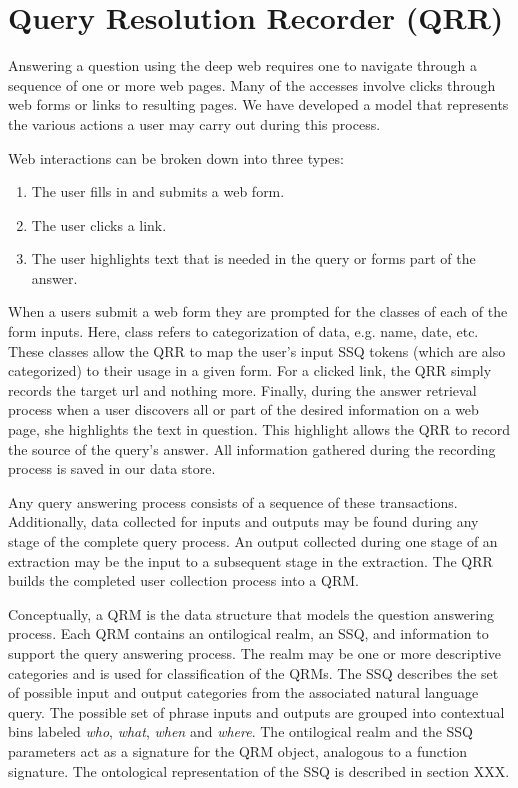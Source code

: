 \section{Query Resolution Recorder (QRR)}
\label{sec:qrr}
Answering a question using the deep web requires one to navigate
through a sequence of one or more web pages. Many of the accesses involve clicks through web forms or links to resulting pages.  We have developed a model that represents the various actions a user may carry out during this process.

Web interactions can be broken down into three types:
\begin{enumerate}
\item The user fills in and submits a web form.
\item The user clicks a link.
\item The user highlights text that is needed in the query or forms part of the answer. 
\end{enumerate}

When a users submit a web form they are prompted for the classes of each of the form inputs. Here, class refers to categorization of data, e.g. name, date, etc. These classes allow the QRR to map the user's input SSQ tokens (which are also categorized) to their usage in a given form. For a clicked link, the QRR simply records the target url and nothing more. Finally, during the answer retrieval process when a user discovers all or part of the desired information on a web page, she highlights the text in question. This highlight allows the QRR to record the source of the query's answer. All information gathered during the recording process is saved in our data store. 

Any query answering process consists of a sequence of these transactions.
Additionally, data collected for inputs and outputs may be found
during any stage of the complete query process.  An output
collected during one stage of an extraction may be the input to a
subsequent stage in the extraction.  The QRR builds the completed user
collection process into a QRM.  

Conceptually, a QRM is the data structure that models the question answering process.  Each QRM contains an ontilogical realm, an SSQ, and information to support the query answering process.  The realm may be one or more descriptive categories and is used for classification of the QRMs.  The SSQ describes the set of possible input and output categories from the associated natural language query.  The possible set of phrase inputs and outputs are grouped into contextual bins labeled \emph{who}, \emph{what}, \emph{when} and \emph{where}.  The ontilogical realm and the SSQ parameters act as a signature for the QRM object, analogous to a function signature.   The ontological representation of the SSQ is described in section {{XXX}}.  

